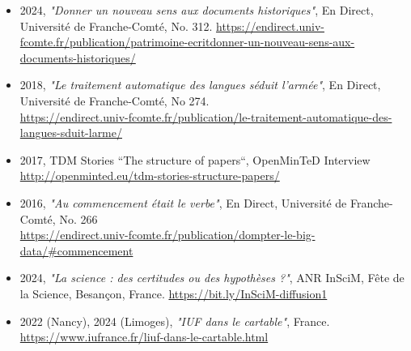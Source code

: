 \begin{itemize}
\item 2024, \textit{"Donner un nouveau sens aux documents historiques"}, En Direct, Université de Franche-Comté, No. 312. \url{https://endirect.univ-fcomte.fr/publication/patrimoine-ecritdonner-un-nouveau-sens-aux-documents-historiques/}
\item 2018, \textit{"Le traitement automatique des langues séduit l'armée"}, En Direct, Université de Franche-Comté, No 274. \\ \url{https://endirect.univ-fcomte.fr/publication/le-traitement-automatique-des-langues-sduit-larme/}
\item 2017, TDM Stories “The structure of papers“, OpenMinTeD Interview\\\url{http://openminted.eu/tdm-stories-structure-papers/}
\item 2016, \textit{"Au commencement était le verbe"}, En Direct, Université de Franche-Comté, No. 266\\ \url{https://endirect.univ-fcomte.fr/publication/dompter-le-big-data/#commencement}
\end{itemize}

\vspace{3mm}

{\textsc{}}


\begin{itemize}
\item 2024, \textit{"La science : des certitudes ou des hypothèses ?"},  ANR InSciM, Fête de la Science, Besançon, France. \url{https://bit.ly/InSciM-diffusion1}
\item 2022 (Nancy), 2024 (Limoges),  \textit{"IUF dans le cartable"}, France. \url{https://www.iufrance.fr/liuf-dans-le-cartable.html}
\end{itemize}

\section{}

%


